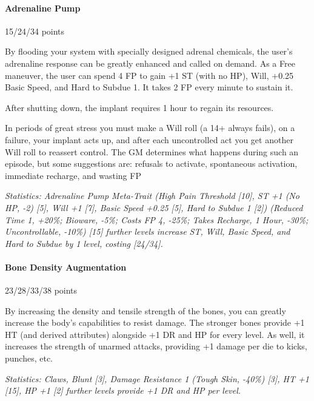 \begin{multicols*}{3}
	\paragraph{Adrenaline Pump}
	\begin{flushright}
		15/24/34 points
	\end{flushright}
	
	By flooding your system with specially designed adrenal chemicals, the user's adrenaline response can be greatly enhanced and called on demand. As a Free maneuver, the user can spend 4 FP to gain +1 ST (with no HP), Will, +0.25 Basic Speed, and Hard to Subdue 1. It takes 2 FP every minute to sustain it. 
	
	After shutting down, the implant requires 1 hour to regain its resources. 
	
	In periods of great stress you  must make a Will roll (a 14+ always fails), on a failure, your implant acts up, and after each uncontrolled act you get another Will roll to reassert control. The GM determines what happens during such an episode, but some suggestions are: refusals to activate, spontaneous activation, immediate recharge, and wasting FP
	
	\textit{\textcolor{OliveGreen}{Statistics: Adrenaline Pump Meta-Trait (High Pain Threshold [10], ST +1 (No HP, -2) [5], Will +1 [7], Basic Speed +0.25 [5], Hard to Subdue 1 [2]) (Reduced Time 1, +20\%; Bioware, -5\%; Costs FP 4, -25\%; Takes Recharge, 1 Hour, -30\%; Uncontrollable,  -10\%) [15] further levels increase ST, Will, Basic Speed, and Hard to Subdue by 1 level, costing  [24/34].}}
	
	\paragraph{Bone Density Augmentation}
	\begin{flushright}
		23/28/33/38 points
	\end{flushright}
	
	By increasing the density and tensile strength of the bones, you can greatly increase the body's capabilities to resist damage. The stronger bones provide +1 HT (and derived attributes) alongside +1 DR and HP for every level. As well, it increases the strength of unarmed attacks, providing +1 damage per die to kicks, punches, etc.
	
	\textit{\textcolor{OliveGreen}{Statistics: Claws, Blunt [3], Damage Resistance 1 (Tough Skin, -40\%) [3], HT +1 [15], HP +1 [2] further levels provide +1 DR and HP per level.}}
	

\end{multicols*}
